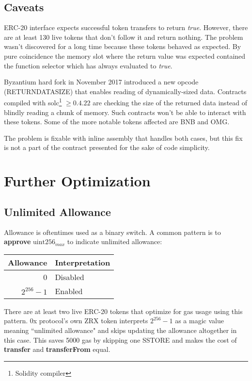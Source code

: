 \documentclass[12pt]{article}
\begin{document}
\subsection{Caveats}

ERC-20 interface expects successful token transfers to return \textit{true}.
However, there are at least 130 live tokens that don't follow it and return nothing.
The problem wasn't discovered for a long time because these tokens behaved as expected\cite{cremer}.
By pure coincidence the memory slot where the return value was expected contained the function selector which has always evaluated to \textit{true}.

Byzantium hard fork in November 2017 introduced a new opcode (RETURNDATASIZE) that enables reading of dynamically-sized data.
Contracts compiled with solc\footnote{Solidity compiler} $\geq 0.4.22$ are checking the size of the returned data instead of blindly reading a chunk of memory.
Such contracts won't be able to interact with these tokens.
Some of the more notable tokens affected are BNB and OMG.

The problem is fixable with inline assembly that handles both cases, but this fix is not a part of the contract presented for the sake of code simplicity.


\section{Further Optimization}

\subsection{Unlimited Allowance}
Allowance is oftentimes used as a binary switch.
A common pattern is to \textbf{approve} $\text{uint256}_{max}$ to indicate unlimited allowance:

\begin{center}	
\begin{tabular}{r l}
Allowance & Interpretation \\ \midrule
0 & Disabled  \\
$2^{256}-1$ & Enabled
\end{tabular}
\end{center}

There are at least two live ERC-20 tokens that optimize for gas usage using this pattern.
0x protocol's own ZRX token interprets $2^{256}-1$ as a magic value meaning ``unlimited allowance" and skips updating the allowance altogether in this case\cite{zrx-unlimited}.
This saves 5000 gas by skipping one SSTORE and makes the cost of \textbf{transfer} and \textbf{transferFrom} equal.
\end{document}

